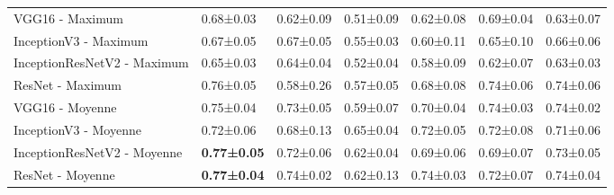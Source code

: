 \begin{landscape}
\begin{table}[]
\begin{tabular}{lllllll}
VGG16    - Maximum            & 0.68±0.03          & 0.62±0.09          & 0.51±0.09         & 0.62±0.08         & 0.69±0.04             & 0.63±0.07 \\
InceptionV3  - Maximum        & 0.67±0.05          & 0.67±0.05          & 0.55±0.03         & 0.60±0.11         & 0.65±0.10             & 0.66±0.06 \\
InceptionResNetV2  - Maximum  & 0.65±0.03          & 0.64±0.04          & 0.52±0.04         & 0.58±0.09         & 0.62±0.07             & 0.63±0.03 \\
ResNet - Maximum              & 0.76±0.05          & 0.58±0.26          & 0.57±0.05         & 0.68±0.08         & 0.74±0.06             & 0.74±0.06 \\
VGG16 - Moyenne               & 0.75±0.04          & 0.73±0.05          & 0.59±0.07         & 0.70±0.04         & 0.74±0.03             & 0.74±0.02 \\
InceptionV3 - Moyenne         & 0.72±0.06          & 0.68±0.13          & 0.65±0.04         & 0.72±0.05         & 0.72±0.08             & 0.71±0.06 \\
InceptionResNetV2 - Moyenne   & \textbf{0.77±0.05} & 0.72±0.06          & 0.62±0.04         & 0.69±0.06         & 0.69±0.07             & 0.73±0.05 \\
\rowcolor[HTML]{E7E6E6} 
ResNet - Moyenne              & \textbf{0.77±0.04} & 0.74±0.02          & 0.62±0.13         & 0.74±0.03         & 0.72±0.07             & 0.74±0.04
\end{tabular}
\label{tab:image_classification_mm}
\end{table}
\end{landscape}


